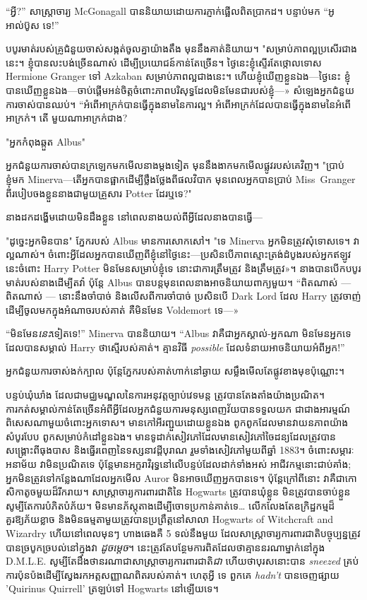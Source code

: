“អ្វី?” សាស្រ្តាចារ្យ McGonagall បាននិយាយដោយការភ្ញាក់ផ្អើលពិតប្រាកដ។ បន្ទាប់មក “អូ អាល់ប៊ូស ទេ!”

បបូរ​មាត់​របស់​គ្រូ​ជំនួយ​ចាស់​សង្កត់​ចូល​គ្នា​យ៉ាង​តឹង​ មុន​នឹង​គាត់​និយាយ។ "សម្រាប់​ភាព​ល្អ​ប្រសើរ​ជាង​នេះ​។ ខ្ញុំបានលះបង់ច្រើនណាស់ ដើម្បីប្រយោជន៍កាន់តែច្រើន។ ថ្ងៃនេះខ្ញុំស្ទើរតែថ្កោលទោស Hermione Granger ទៅ Azkaban សម្រាប់ភាពល្អជាងនេះ។ ហើយ​ខ្ញុំ​ឃើញ​ខ្លួន​ឯង—ថ្ងៃ​នេះ ខ្ញុំ​បាន​ឃើញ​ខ្លួន​ឯង—ចាប់​ផ្ដើម​អន់​ចិត្ត​ចំពោះ​ភាព​បរិសុទ្ធ​ដែល​មិន​មែន​ជា​របស់​ខ្ញុំ—» សំឡេង​អ្នក​ជំនួយ​ការ​ចាស់​បាន​ឈប់។ “អំពើ​អាក្រក់​បាន​ធ្វើ​ក្នុង​នាម​នៃ​ការ​ល្អ។ អំពើ​អាក្រក់​ដែល​បាន​ធ្វើ​ក្នុង​នាម​នៃ​អំពើ​អាក្រក់​។ តើ \emph{} មួយណាអាក្រក់ជាង?

"អ្នកកំពុងឆ្កួត Albus"

អ្នកជំនួយការចាស់បានក្រឡេកមកមើលនាងម្តងទៀត មុននឹងងាកមកមើលផ្លូវរបស់គេវិញ។ "ប្រាប់ខ្ញុំមក Minerva—តើអ្នកបានផ្អាកដើម្បីថ្លឹងថ្លែងពីផលវិបាក មុនពេលអ្នកបានប្រាប់ Miss~Granger ពីរបៀបចងខ្លួននាងជាមួយគ្រួសារ Potter ដែរឬទេ?"

នាងដកដង្ហើមដោយមិនដឹងខ្លួន នៅពេលនាងយល់ពីអ្វីដែលនាងបានធ្វើ—

"ដូច្នេះអ្នកមិនបាន" ភ្នែករបស់ Albus មានការសោកសៅ។ "ទេ Minerva អ្នកមិនត្រូវសុំទោសទេ។ វាល្អណាស់។ ចំពោះអ្វីដែលអ្នកបានឃើញពីខ្ញុំនៅថ្ងៃនេះ—ប្រសិនបើភាពស្មោះត្រង់ដំបូងរបស់អ្នកឥឡូវនេះចំពោះ Harry Potter មិនមែនសម្រាប់ខ្ញុំទេ នោះជាការត្រឹមត្រូវ និងត្រឹមត្រូវ»។ នាងបានបើកបបូរមាត់របស់នាងដើម្បីតវ៉ា ប៉ុន្តែ Albus បានបន្តមុនពេលនាងអាចនិយាយពាក្យមួយ។ “ពិត​ណាស់ — ពិត​ណាស់ — នោះ​នឹង​ចាំបាច់ និង​លើស​ពី​ការ​ចាំបាច់ ប្រសិន​បើ Dark Lord ដែល Harry ត្រូវ​ចាញ់​ដើម្បី​ចូល​មក​ក្នុង​អំណាច​របស់​គាត់ គឺ​មិន​មែន Voldemort ទេ—»

“មិនមែន\emph{នេះ}ទៀតទេ!” Minerva បាននិយាយ។ “Albus វាគឺជាអ្នកស្គាល់-អ្នកណា មិនមែនអ្នកទេ ដែលបានសម្គាល់ Harry ថាស្មើរបស់គាត់។ គ្មានវិធី \emph{possible} ដែលទំនាយអាចនិយាយអំពីអ្នក!”

អ្នកជំនួយការចាស់ងក់ក្បាល ប៉ុន្តែភ្នែករបស់គាត់ហាក់នៅឆ្ងាយ សម្លឹងមើលតែផ្លូវខាងមុខប៉ុណ្ណោះ។

\later

បន្ទប់ឃុំឃាំង ដែលជាមជ្ឈមណ្ឌលនៃការអនុវត្តច្បាប់វេទមន្ត ត្រូវបានតែងតាំងយ៉ាងប្រណិត។ ការកត់សម្គាល់កាន់តែច្រើនអំពីអ្វីដែលអ្នកជំនួយការមនុស្សពេញវ័យបានទទួលយក ជាជាងអារម្មណ៍ពិសេសណាមួយចំពោះអ្នកទោស។ មានកៅអីរញ្ជួយដោយខ្លួនឯង ពូកពូកដែលមានវាយនភាពយ៉ាងសំបូរបែប ពូកសម្រាប់កំដៅខ្លួនឯង។ មានទូដាក់សៀវភៅដែលមានសៀវភៅចៃដន្យដែលត្រូវបានសង្គ្រោះពីធុងបាស និងធ្នើរពេញនៃទស្សនាវដ្តីបុរាណ រួមទាំងសៀវភៅមួយពីឆ្នាំ 1883។ ចំពោះសម្ភារៈអនាម័យ វាមិនប្រណិតទេ ប៉ុន្តែមានអក្ខរាវិរុទ្ធនៅលើបន្ទប់ដែលដាក់ទាំងអស់ អាជីវកម្មនោះជាប់គាំង; អ្នក​មិន​ត្រូវ​ទៅ​កន្លែង​ណា​ដែល​អ្នក​មើល Auror មិន​អាច​ឃើញ​អ្នក​បាន​ទេ។ ប៉ុន្តែក្រៅពីនោះ វាគឺជាកោសិកាតូចមួយដ៏រីករាយ។ សាស្ត្រាចារ្យការពារជាតិនៃ Hogwarts ត្រូវបានឃុំខ្លួន មិនត្រូវបានចាប់ខ្លួន សូម្បីតែការបំភិតបំភ័យ។ មិនមានភ័ស្តុតាងដើម្បីចោទប្រកាន់គាត់ទេ… លើកលែងតែឧក្រិដ្ឋកម្មដ៏គួរឱ្យភ័យខ្លាច និងមិនធម្មតាមួយត្រូវបានប្រព្រឹត្តនៅសាលា Hogwarts of Witchcraft and Wizardry ហើយនៅពេលមុនៗ ហាងឆេងគឺ 5 ទល់នឹងមួយ ដែលសាស្រ្តាចារ្យការពារជាតិបច្ចុប្បន្នត្រូវបានច្របូកច្របល់នៅក្នុងវា \emph{ដូចម្ដេច}។ នេះត្រូវតែបន្ថែមការពិតដែលថាគ្មាននរណាម្នាក់នៅក្នុង D.M.L.E. សូម្បីតែដឹងថានរណាជាសាស្រ្តាចារ្យការពារជាតិ\emph{ជា} ហើយថាបុរសនោះបាន \emph{sneezed} គ្រប់ការប៉ុនប៉ងដើម្បីស្វែងរកអត្តសញ្ញាណពិតរបស់គាត់។ ហេតុអ្វី ទេ ពួកគេ \emph{hadn't} បានចេញផ្សាយ 'Quirinus Quirrell' ត្រឡប់ទៅ Hogwarts នៅឡើយទេ។

